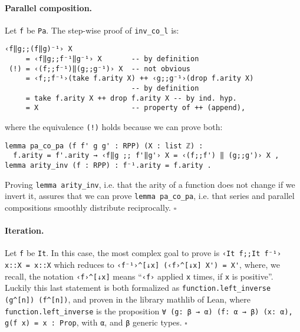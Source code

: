 \documentclass[runningheads]{llncs}
\newcommand*{\qedb}{\hfill\ensuremath{\square}}%
\newcommand{\MATHLIB}{\textsf{mathlib}\xspace}
\newcommand{\LEAN}{\textsf{Lean}\xspace}
\begin{document}

\paragraph{Parallel composition.} Let \lstinline|f| be \lstinline|Pa|. The step-wise proof of \lstinline|inv_co_l| is:
\begin{lstlisting}
‹f‖g;;(f‖g)⁻¹› X              
     = ‹f‖g;;f⁻¹‖g⁻¹› X       -- by definition
 (!) = ‹(f;;f⁻¹)‖(g;;g⁻¹)› X  -- not obvious
     = ‹f;;f⁻¹›(take f.arity X) ++ ‹g;;g⁻¹›(drop f.arity X)
                              -- by definition
     = take f.arity X ++ drop f.arity X -- by ind. hyp.
     = X                      -- property of ++ (append),
\end{lstlisting}
where the equivalence \lstinline|(!)| holds because we can prove both:
\begin{lstlisting}
lemma pa_co_pa (f f' g g' : RPP) (X : list ℤ) :
  f.arity = f'.arity → ‹f‖g ;; f'‖g'› X = ‹(f;;f') ‖ (g;;g')› X ,
lemma arity_inv (f : RPP) : f⁻¹.arity = f.arity .
\end{lstlisting}
Proving \lstinline|lemma arity_inv|, i.e. that the arity of a function does not change if we invert it, assures that we can prove \lstinline|lemma pa_co_pa|, i.e. that series and parallel compositions smoothly distribute reciprocally.
\qedb

\paragraph{Iteration.} Let \lstinline|f| be \lstinline|It|.
In this case, the most complex goal to prove is \lstinline|‹It f;;It f⁻¹› x::X = x::X| which reduces to \lstinline|‹f⁻¹›^[↓x] (‹f›^[↓x] X') = X'|, where, we recall, the notation \lstinline|‹f›^[↓x]| means ``\lstinline|‹f›| applied \lstinline|x| times, if \lstinline|x| is positive''. Luckily this last statement is both formalized as \lstinline|function.left_inverse (g^[n]) (f^[n])|, and proven in the library \MATHLIB of \LEAN, where \lstinline|function.left_inverse| is the proposition \lstinline|∀ (g: β → α) (f: α → β) (x: α), g(f x) = x : Prop|, with \lstinline|α|, and \lstinline|β| generic types.
\qedb
\end{document}
